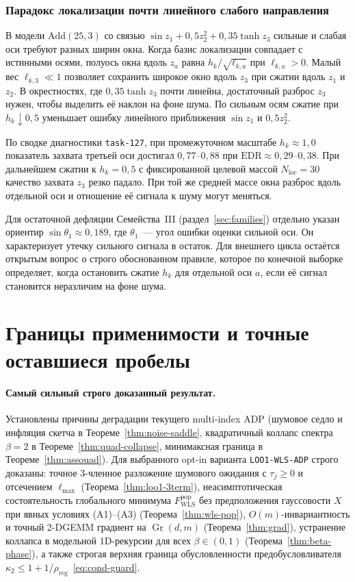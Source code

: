 \documentclass[11pt,a4paper]{article}
\numberwithin{equation}{section}
\theoremstyle{definition}
\theoremstyle{remark}
\newcommand{\Gr}{\operatorname{Gr}}
\newcommand{\code}[1]{\nolinkurl{#1}}
\begin{document}
\subsubsection*{Парадокс локализации почти линейного слабого направления}
В модели $\mathrm{Add}(25,3)$ со связью $\sin z_1 + 0{,}5 z_2^2 + 0{,}35\tanh z_3$
сильные и слабая оси требуют разных ширин окна. Когда базис локализации совпадает
с истинными осями, полуось окна вдоль $z_a$ равна $h_k/\sqrt{\ell_{k,a}}$ при
$\ell_{k,a}>0$. Малый вес $\ell_{k,3}\ll 1$ позволяет сохранить широкое окно
вдоль $z_3$ при сжатии вдоль $z_1$ и $z_2$. В окрестностях, где $0{,}35\tanh z_3$
почти линейна, достаточный разброс $z_3$ нужен, чтобы выделить её наклон на фоне
шума. По сильным осям сжатие при $h_k\downarrow 0{,}5$ уменьшает ошибку линейного
приближения $\sin z_1$ и $0{,}5z_2^2$.

По сводке диагностики \code{task-127}, при промежуточном масштабе $h_k\approx 1{,}0$
показатель захвата третьей оси достигал $0{,}77$--$0{,}88$ при
$\mathrm{EDR}\approx 0{,}29$--$0{,}38$. При дальнейшем сжатии к $h_k=0{,}5$
с фиксированной целевой массой $N_{\mathrm{loc}}=30$ качество захвата $z_3$
резко падало. При той же средней массе окна разброс вдоль отдельной оси
и отношение её сигнала к шуму могут меняться.

Для остаточной дефляции Семейства~III (раздел~\ref{sec:families}) отдельно
указан ориентир $\sin\theta_1\approx 0{,}189$, где $\theta_1$~--- угол ошибки
оценки сильной оси. Он характеризует утечку сильного сигнала в остаток.
Для внешнего цикла остаётся открытым вопрос о строго обоснованном правиле,
которое по конечной выборке определяет, когда остановить сжатие $h_k$
для отдельной оси $a$, если её сигнал становится неразличим на фоне шума.

\section{Границы применимости и точные оставшиеся пробелы}
\label{sec:gaps}

\paragraph{Самый сильный строго доказанный результат.}
Установлены причины деградации текущего multi-index ADP (шумовое седло и инфляция скетча в
Теореме~\ref{thm:noise-saddle}, квадратичный коллапс спектра $\beta=2$ в Теореме~\ref{thm:quad-collapse},
минимаксная граница в Теореме~\ref{thm:assouad}). Для выбранного opt-in варианта \texttt{LOO1-WLS-ADP}
строго доказаны: точное 3-членное разложение шумового ожидания с $\tau_j \ge 0$ и отсечением $\ell_{\max}$
(Теорема~\ref{thm:loo1-3term}), неасимптотическая состоятельность глобального минимума $F_{\mathrm{WLS}}^{\mathrm{pop}}$
без предположения гауссовости $X$ при явных условиях (A1)--(A3) (Теорема~\ref{thm:wls-pop}),
$O(m)$-инвариантность и точный 2-DGEMM градиент на $\Gr(d,m)$ (Теорема~\ref{thm:grad}),
устранение коллапса в модельной 1D-рекурсии для всех $\beta \in (0, 1)$ (Теорема~\ref{thm:beta-phase}),
а также строгая верхняя граница обусловленности предобусловливателя $\kappa_2 \le 1 + 1/\rho_{\mathrm{reg}}$~\eqref{eq:cond-guard}.
\end{document}
